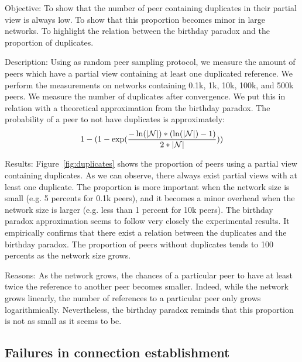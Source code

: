 \begin{asparadesc} 
\item[Objective:] To show that the number of peer containing duplicates in
  their partial view is always low.  To show that this proportion becomes minor
  in large networks. To highlight the relation between the birthday paradox and
  the proportion of duplicates.
\item[Description:] Using \SCAMP as random peer sampling protocol, we measure
  the amount of peers which have a partial view containing at least one
  duplicated reference. We perform the measurements on networks containing
  0.1k, 1k, 10k, 100k, and 500k peers. We measure the number of duplicates
  after convergence. We put this in relation with a theoretical approximation
  from the birthday paradox. The probability of a peer to not have duplicates
  is approximately:
  \begin{equation}
    1- 
    (1-
    \exp({-\ln(|\mathcal{N}|)*(\ln(|\mathcal{N}|)-1)\over{2*|\mathcal{N}|}}))
  \end{equation}
\item[Results:] Figure~\ref{fig:duplicates} shows the proportion of peers using
  a partial view containing duplicates. As we can observe, there always exist
  partial views with at least one duplicate. The proportion is more important
  when the network size is small (e.g. 5 percents for 0.1k peers), and it
  becomes a minor overhead when the network size is larger (e.g. less than 1
  percent for 10k peers). The birthday paradox approximation seems to follow
  very closely the experimental results. It empirically confirms that there
  exist a relation between the duplicates and the birthday paradox. The
  proportion of peers without duplicates tends to 100 percents as the network
  size grows.
\item[Reasons:] As the network grows, the chances of a particular peer to have
  at least twice the reference to another peer becomes smaller. Indeed, while
  the network grows linearly, the number of references to a particular peer
  only grows logarithmically. Nevertheless, the birthday paradox reminds that
  this proportion is not as small as it seems to be.
\end{asparadesc}


\subsection{Failures in connection establishment}
\label{subsec:degeneration}

